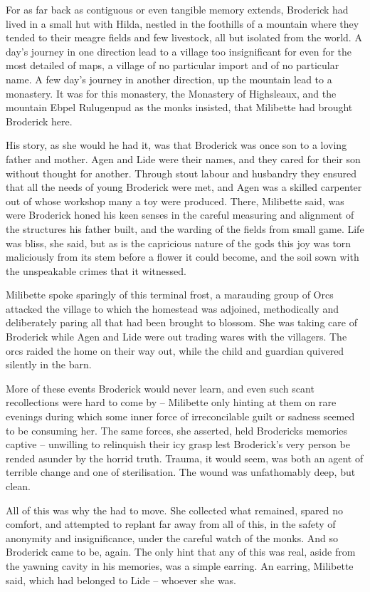 For as far back as contiguous or even tangible memory extends,
Broderick had lived in a small hut with Hilda, nestled in the
foothills of a mountain where they tended to their meagre fields and
few livestock, all but isolated from the world. A day's journey in one
direction lead to a village too insignificant for even for the most
detailed of maps, a village of no particular import and of no
particular name. A few day's journey in another direction, up the
mountain lead to a monastery. It was for this monastery, the Monastery
of Highsleaux, and the mountain Ebpel Rulugenpud as the monks
insisted, that Milibette had brought Broderick here.

His story, as she would he had it, was that Broderick was once son to
a loving father and mother. Agen and Lide were their names, and they
cared for their son without thought for another. Through stout labour
and husbandry they ensured that all the needs of young Broderick were
met, and Agen was a skilled carpenter out of whose workshop many a toy
were produced. There, Milibette said, was were Broderick honed his
keen senses in the careful measuring and alignment of the structures
his father built, and the warding of the fields from small game. Life
was bliss, she said, but as is the capricious nature of the gods this
joy was torn maliciously from its stem before a flower it could
become, and the soil sown with the unspeakable crimes that it
witnessed.

Milibette spoke sparingly of this terminal frost, a marauding group of
Orcs attacked the village to which the homestead was adjoined,
methodically and deliberately paring all that had been brought to
blossom. She was taking care of Broderick while Agen and Lide were out
trading wares with the villagers. The orcs raided the home on their
way out, while the child and guardian quivered silently in the barn.

More of these events Broderick would never learn, and even such scant
recollections were hard to come by -- Milibette only hinting at them
on rare evenings during which some inner force of irreconcilable guilt
or sadness seemed to be consuming her. The same forces, she asserted,
held Brodericks memories captive -- unwilling to relinquish their icy
grasp lest Broderick's very person be rended asunder by the horrid
truth. Trauma, it would seem, was both an agent of terrible change and
one of sterilisation. The wound was unfathomably deep, but clean.

All of this was why the had to move. She collected what remained,
spared no comfort, and attempted to replant far away from all of this,
in the safety of anonymity and insignificance, under the careful watch
of the monks. And so Broderick came to be, again. The only hint that
any of this was real, aside from the yawning cavity in his memories,
was a simple earring. An earring, Milibette said, which had belonged
to Lide -- whoever she was.

